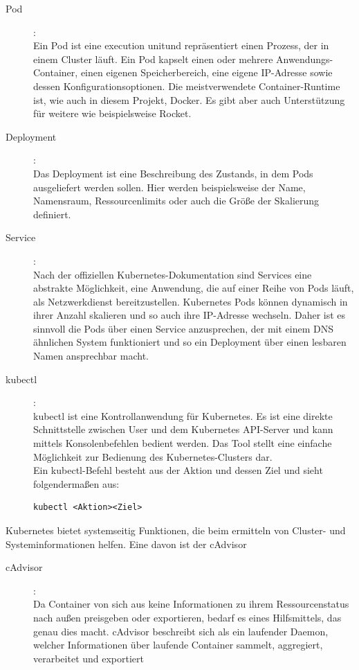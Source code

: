 \documentclass[a4paper,10pt]{scrartcl}
\begin{document}
\begin{description}

\item [Pod]:\\
Ein Pod ist eine \glqq execution unit\grqq und repräsentiert einen Prozess, der in einem Cluster läuft. Ein Pod kapselt einen oder mehrere Anwendungs-Container, einen eigenen Speicherbereich, eine eigene IP-Adresse sowie dessen Konfigurationsoptionen.
Die meistverwendete Container-Runtime ist, wie auch in diesem Projekt, Docker. Es gibt aber auch Unterstützung für weitere wie beispielsweise Rocket. \cite{pod}%
\item [Deployment]:\\
Das Deployment ist eine Beschreibung des Zustands, in dem Pods ausgeliefert werden sollen. Hier werden beispielsweise der Name, Namensraum, Ressourcenlimits oder auch die Größe der Skalierung definiert. \cite{deployment}%
\item [Service]:\\
Nach der offiziellen Kubernetes-Dokumentation sind Services eine \glqq abstrakte Möglichkeit, eine Anwendung, die auf einer Reihe von Pods läuft, als Netzwerkdienst bereitzustellen\grqq. \cite{service} %
Kubernetes Pods können dynamisch in ihrer Anzahl skalieren und so auch ihre IP-Adresse wechseln. Daher ist es sinnvoll die Pods über einen Service anzusprechen, der mit einem DNS ähnlichen System funktioniert und so ein Deployment über einen lesbaren Namen ansprechbar macht. 
\item [kubectl]:\\
kubectl ist eine Kontrollanwendung für Kubernetes. Es ist eine direkte Schnittstelle zwischen User und dem Kubernetes API-Server und kann mittels Konsolenbefehlen bedient werden. Das Tool stellt eine einfache Möglichkeit zur Bedienung des Kubernetes-Clusters dar.  \cite{kubectl} \\
Ein kubectl-Befehl besteht aus der Aktion und dessen Ziel und sieht folgendermaßen aus:
\begin{lstlisting}
kubectl <Aktion><Ziel>
\end{lstlisting}
\end{description}

Kubernetes bietet systemseitig Funktionen, die beim ermitteln von Cluster- und Systeminformationen helfen. Eine davon ist der cAdvisor
 
\begin{description} 
\item [cAdvisor]:\\
Da Container von sich aus keine Informationen zu ihrem Ressourcenstatus nach außen preisgeben oder exportieren, bedarf es eines Hilfsmittels, das genau dies macht.
cAdvisor beschreibt sich als \glqq ein laufender Daemon, welcher Informationen über laufende Container sammelt, aggregiert, verarbeitet und exportiert\grqq
\cite{GithubUser:dashpole.05.07.2020}

\end{description}
\end{document}
